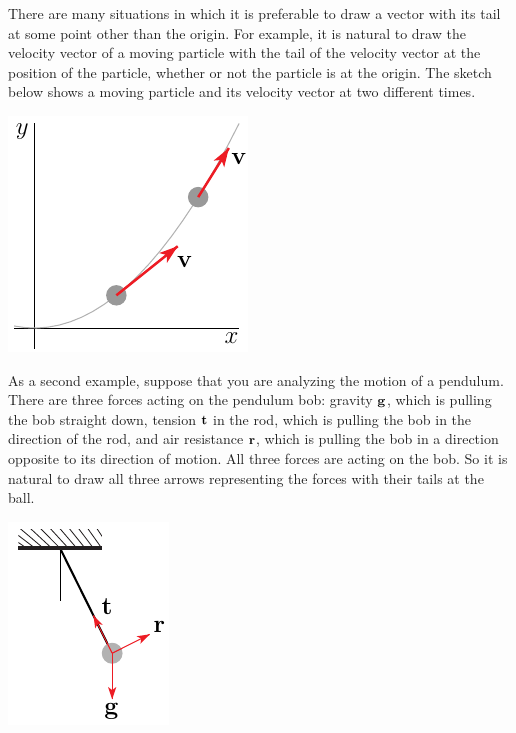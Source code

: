 There are many situations in which it is preferable to draw a vector 
with its tail at some point other than the origin. For example, it is 
natural to draw the velocity vector of a moving particle with the tail
of the velocity vector at the position of the particle, whether or not
the particle is at the origin. The sketch below shows a moving particle
and its velocity vector at two different times.
      \begin{efig} 
      \begin{center}
      \includegraphics{movingParticle.pdf}
      \end{center}
      \end{efig}
As a second example, suppose that you are analyzing the motion of a pendulum.
There are three forces acting on the pendulum bob: gravity $\mathbf{g}$, which
is pulling the bob straight down, tension $\mathbf{t}$ in the rod, which is
pulling the bob in the direction of the rod, and air resistance $\mathbf{r}$, 
which is pulling the bob in a direction opposite to its direction of motion.
All three forces are acting on the bob. So it is natural to draw all three
arrows representing the forces with their tails at the ball. 
      \begin{efig} 
      \begin{center}
      \includegraphics{pendulum.pdf}
      \end{center}
      \end{efig}

